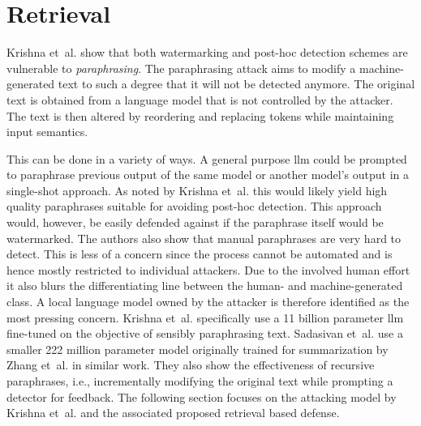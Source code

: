     \section{Retrieval}
    \label{sec:retrieval}
    Krishna et~al. \cite{krishna2023paraphrasing} show that both watermarking and post-hoc detection schemes are vulnerable to \emph{paraphrasing}.
    The paraphrasing attack aims to modify a machine-generated text to such a degree that it will not be detected anymore.
    The original text is obtained from a language model that is not controlled by the attacker.
    The text is then altered by reordering and replacing tokens while maintaining input semantics.
    
    This can be done in a variety of ways.
    A general purpose \ac{llm} could be prompted to paraphrase previous output of the same model or another model's output in a single-shot approach.
    As noted by Krishna et~al. \cite{krishna2023paraphrasing} this would likely yield high quality paraphrases suitable for avoiding post-hoc detection.
    This approach would, however, be easily defended against if the paraphrase itself would be watermarked.
    The authors also show that manual paraphrases are very hard to detect.
    This is less of a concern since the process cannot be automated and is hence mostly restricted to individual attackers.
    Due to the involved human effort it also blurs the differentiating line between the human- and machine-generated class.
    A local language model owned by the attacker is therefore identified as the most pressing concern.
    Krishna et~al. \cite{krishna2023paraphrasing} specifically use a 11 billion parameter \ac{llm} fine-tuned on the objective of sensibly paraphrasing text.
    Sadasivan et~al. \cite{sadasivan2023aigenerated} use a smaller 222 million parameter model originally trained for summarization by Zhang et~al. \cite{zhang2020pegasus} in similar work.
    They also show the effectiveness of recursive paraphrases, i.e., incrementally modifying the original text while prompting a detector for feedback.
    The following section focuses on the attacking model by Krishna et~al. \cite{krishna2023paraphrasing} and the associated proposed retrieval based defense.  
    
